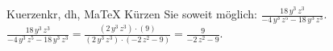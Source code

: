 \begin{MAufgabe}{Kuerzen}{kr, dh, MaTeX}
K\"urzen Sie soweit m\"oglich: $\frac{18\, y^3\, z^3}{ - 4\, y^3\, z^5 - 18\, y^3\, z^3}$.\\ 
\ifLsg\MLoesung
\quad $\frac{18\, y^3\, z^3}{ - 4\, y^3\, z^5 - 18\, y^3\, z^3}=\frac{(2\, y^3\, z^3)\cdot(9)}{(2\, y^3\, z^3)\cdot( - 2\, z^2 - 9)}=\frac{9}{ - 2\, z^2 - 9}$.\else\relax\fi
 \end{MAufgabe}
